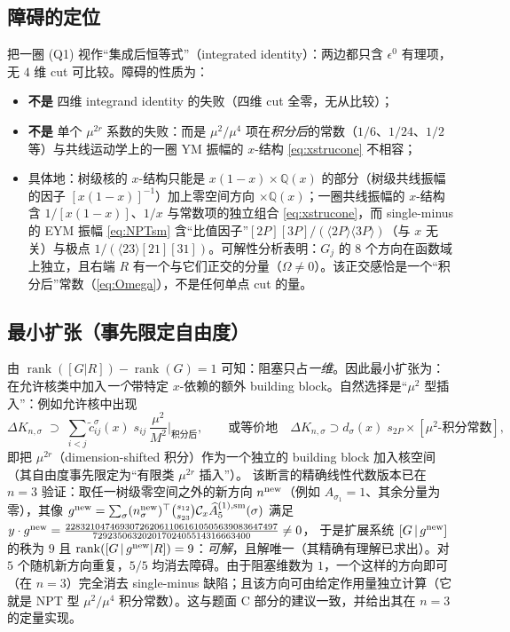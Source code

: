 \documentclass[11pt]{article}
\newcommand{\Cx}{\mathcal{C}_x}
\newcommand{\ab}[1]{\langle #1\rangle}
\newcommand{\sq}[1]{[#1]}
\newcommand{\Ahat}{\widehat{A}}
\newcommand{\Pt}{P}
\begin{document}
\subsection{障碍的定位}
把一圈 (Q1) 视作“集成后恒等式”（integrated identity）：两边都只含 $\epsilon^0$ 有理项，无 $4$ 维 cut 可比较。障碍的性质为：
\begin{itemize}
\item \textbf{不是} 四维 integrand identity 的失败（四维 cut 全零，无从比较）；
\item \textbf{不是} 单个 $\mu^{2r}$ 系数的失败：而是 $\mu^2/\mu^4$ 项在\emph{积分后}的常数（$1/6$、$1/24$、$1/2$ 等）与共线运动学上的一圈 YM 振幅的 $x$-结构 \eqref{eq:xstrucone} 不相容；
\item 具体地：树级核的 $x$-结构只能是 $x(1-x)\times\mathbb Q(x)$ 的部分（树级共线振幅的因子 $[x(1-x)]^{-1}$）加上零空间方向 $\times\mathbb Q(x)$；一圈共线振幅的 $x$-结构含 $1/[x(1-x)]$、$1/x$ 与常数项的独立组合 \eqref{eq:xstrucone}，而 single-minus 的 EYM 振幅 \eqref{eq:NPTsm} 含“比值因子”$\sq{2\Pt}\sq{3\Pt}/(\ab{2\Pt}\ab{3\Pt})$（与 $x$ 无关）与极点 $1/(\ab{23}\sq{21}\sq{31})$。可解性分析表明：$G_j$ 的 $8$ 个方向在函数域上独立，且右端 $R$ 有一个与它们正交的分量（$\Omega\neq0$）。该正交感恰是一个“积分后”常数（\eqref{eq:Omega}），不是任何单点 cut 的量。
\end{itemize}

\subsection{最小扩张（事先限定自由度）}
由 $\operatorname{rank}([G|R])-\operatorname{rank}(G)=1$ 可知：阻塞只占\emph{一维}。因此最小扩张为：在允许核类中加入\emph{一个}带特定 $x$-依赖的额外 building block。自然选择是“$\mu^{2}$ 型插入”：例如允许核中出现
\begin{equation}
\Delta K_{n,\sigma}\;\supset\;\sum_{i<j}\tilde c^{\sigma}_{ij}(x)\;s_{ij}\,\frac{\mu^2}{M^2}\Big|_{\text{积分后}},
\qquad\text{或等价地}\quad
\Delta K_{n,\sigma}\supset d_\sigma(x)\;s_{2\Pt}\times[\text{$\mu^2$-积分常数}],
\end{equation}
即把 $\mu^{2r}$（dimension-shifted 积分）作为一个独立的 building block 加入核空间（其自由度事先限定为“有限类 $\mu^{2r}$ 插入”）。
该断言的精确线性代数版本已在 $n=3$ 验证：取任一树级零空间之外的新方向 $n^{\rm new}$（例如 $A_{\sigma_1}=1$、其余分量为零），其像
$g^{\rm new}=\sum_\sigma (n^{\rm new}_\sigma)^\top\binom{s_{12}}{s_{23}}\Cx\Ahat^{(1),\rm sm}_5(\sigma)$
满足 $y\cdot g^{\rm new}=\frac{2283210474693072620611061610505639083647497}{72923506320201702405514316663400}\neq0$，
于是扩展系统 $[G\,|\,g^{\rm new}]$ 的秩为 $9$ 且 $\operatorname{rank}([G\,|\,g^{\rm new}|R])=9$：\emph{可解}，且解唯一（其精确有理解已求出）。对 $5$ 个随机新方向重复，$5/5$ 均消去障碍。由于阻塞维数为 $1$，一个这样的方向即可（在 $n=3$）完全消去 single-minus 缺陷；且该方向可由给定作用量独立计算（它就是 NPT 型 $\mu^2/\mu^4$ 积分常数）。这与题面 C 部分的建议一致，并给出其在 $n=3$ 的定量实现。
\end{document}
